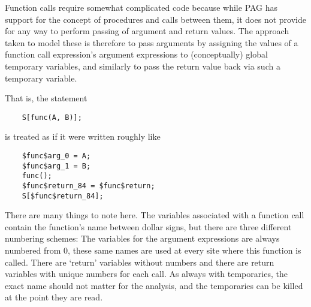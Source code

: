 Function calls require somewhat complicated code because while PAG
has support for the concept of procedures and calls between them, it
does not provide for any way to perform passing of argument and
return values. The approach taken to model these is therefore to
pass arguments by assigning the values of a function call
expression's argument expressions to (conceptually) global temporary
variables, and similarly to pass the return value back via such a
temporary variable.

That is, the statement
\begin{lstlisting}
    S[func(A, B)];
\end{lstlisting}
is treated as if it were written roughly like
\begin{lstlisting}
    $func$arg_0 = A;
    $func$arg_1 = B;
    func();
    $func$return_84 = $func$return;
    S[$func$return_84];
\end{lstlisting}
There are many things to note here. The variables associated
with a function call contain the function's name between dollar
signs, but there are three different numbering schemes: The
variables for the argument expressions are always numbered from 0,
these same names are used at every site where this function is
called. There are `return' variables without numbers and there are
return variables with unique numbers for each call. As always with
temporaries, the exact name should not matter for the analysis, and
the temporaries can be killed at the point they are read.


